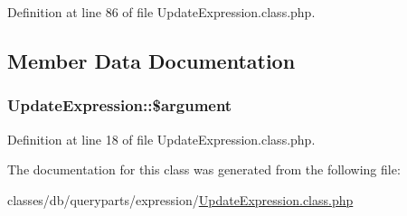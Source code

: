 Definition at line 86 of file Update\-Expression.\-class.\-php.



\subsection{Member Data Documentation}
\hypertarget{classUpdateExpression_a5ad6b27dd8458bfdd8317006ec1c5983}{
\subsubsection[{\$argument}]{\setlength{\rightskip}{0pt plus 5cm}Update\-Expression\-::\$argument}}\label{classUpdateExpression_a5ad6b27dd8458bfdd8317006ec1c5983}


Definition at line 18 of file Update\-Expression.\-class.\-php.



The documentation for this class was generated from the following file\-:\begin{DoxyCompactItemize}
\item 
classes/db/queryparts/expression/\hyperlink{UpdateExpression_8class_8php}{Update\-Expression.\-class.\-php}\end{DoxyCompactItemize}
